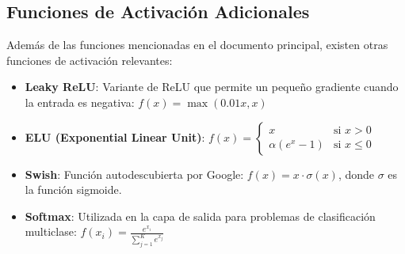 \documentclass[11pt]{article} %
\begin{document}
\subsection{Funciones de Activación Adicionales}

Además de las funciones mencionadas en el documento principal, existen otras funciones de activación relevantes:

\begin{itemize}
    \item \textbf{Leaky ReLU}: Variante de ReLU que permite un pequeño gradiente cuando la entrada es negativa: $f(x) = \max(0.01x, x)$
    
    \item \textbf{ELU (Exponential Linear Unit)}: $f(x) = \begin{cases} x & \text{si } x > 0 \\ \alpha(e^x - 1) & \text{si } x \leq 0 \end{cases}$
    
    \item \textbf{Swish}: Función autodescubierta por Google: $f(x) = x \cdot \sigma(x)$, donde $\sigma$ es la función sigmoide.
    
    \item \textbf{Softmax}: Utilizada en la capa de salida para problemas de clasificación multiclase: $f(x_i) = \frac{e^{x_i}}{\sum_{j=1}^{K} e^{x_j}}$
\end{itemize}
\end{document}
